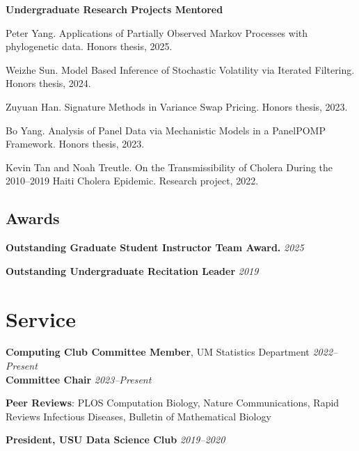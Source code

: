 \documentclass[11pt]{article}
\newenvironment {reflist}
                {
                 \begin{list}{}
                 {\setlength{\labelwidth}{0mm}
                  \setlength{\leftmargin}{8mm}
                  \setlength{\itemindent}{-3mm}
                  \setlength{\labelsep}{0mm}
                  \setlength{\parsep}{0.1 ex}
                  \setlength{\itemsep}{0.1cm}
      \setlength{\topsep}{0.15cm}}} %
   {\end{list}}
\begin{document}
\noindent \textbf{Undergraduate Research Projects Mentored}

\begin{reflist}

  \item Peter Yang. Applications of Partially Observed Markov Processes with phylogenetic data. Honors thesis, 2025.
  \item Weizhe Sun. Model Based Inference of Stochastic Volatility via Iterated Filtering. Honors thesis, 2024.
  \item Zuyuan Han. Signature Methods in Variance Swap Pricing. Honors thesis, 2023.
  \item Bo Yang. Analysis of Panel Data via Mechanistic Models in a PanelPOMP Framework. Honors thesis, 2023.
  \item Kevin Tan and Noah Treutle. On the Transmissibility of Cholera During the 2010--2019 Haiti Cholera Epidemic. Research project, 2022.

\end{reflist}

\subsection*{Awards}

\noindent\hspace{5mm}\textbf{Outstanding Graduate Student Instructor Team Award.} \hfill {\textit{2025}}

\hspace{5mm}\textbf{Outstanding Undergraduate Recitation Leader} \hfill  {\textit{2019}}

\noindent\hspace{5mm}{\it USU Mathematics and Statistics Department}

\section*{Service}

\noindent \textbf{Computing Club Committee Member}, UM Statistics Department \hfill  {\textit{2022--Present}}\\
\noindent \textbf{Committee Chair} \hfill {\it 2023--Present}

\vspace{2mm}
\noindent \textbf{Peer Reviews}: PLOS Computation Biology, Nature Communications, Rapid Reviews Infectious Diseases, Bulletin of Mathematical Biology

\vspace{2mm}
\noindent \textbf{President, USU Data Science Club} \hfill  {\textit{2019--2020}}
\end{document}
